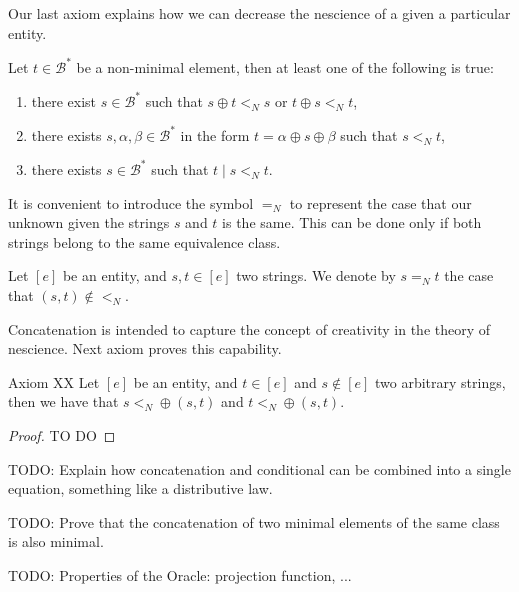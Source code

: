 Our last axiom explains how we can decrease the nescience of a given a particular entity.

\begin{definition}[Axiom A14]
Let $t \in \mathcal{B}^\ast$ be a non-minimal element, then at least one of the following is true:
\begin{enumerate}[label=(\roman*)]
\item there exist $s \in \mathcal{B}^\ast$ such that $s \oplus t <_N s$ or $t \oplus s <_N t$,
\item there exists $s, \alpha, \beta \in \mathcal{B}^\ast$ in the form $t = \alpha \oplus s \oplus \beta$ such that $s <_N t$,
\item there exists $s \in \mathcal{B}^\ast$ such that $t \mid s <_N t$.
\end{enumerate}
\end{definition}

It is convenient to introduce the symbol $=_N$ to represent the case that our unknown given the strings $s$ and $t$ is the same. This can be done only if both strings belong to the same equivalence class.

\begin{notation}
Let $[e]$ be an entity, and $s, t \in [e]$ two strings. We denote by $ s =_N t$ the case that $(s, t) \notin <_N$.
\end{notation}

Concatenation is intended to capture the concept of creativity in the theory of nescience. Next axiom proves this capability.

\begin{proposition}
\item[Axiom XX] Let $[e]$ be an entity, and $t \in [e]$ and $s \notin [e]$ two arbitrary strings, then we have that $s <_N \oplus(s, t)$ and $t <_N \oplus(s, t)$.
\end{proposition}
\begin{proof}
{\color{red} TO DO}
\end{proof}

\begin{proposition}
{\color{red} TODO: Explain how concatenation and conditional can be combined into a single equation, something like a distributive law.}
\end{proposition}

{\color{red} TODO: Prove that the concatenation of two minimal elements of the same class is also minimal.}

{\color{red} TODO: Properties of the Oracle: projection function, ...}

